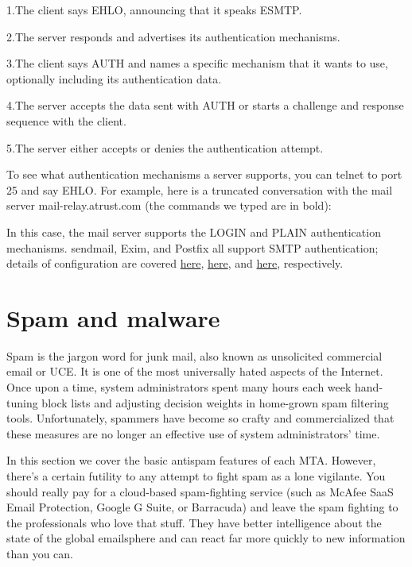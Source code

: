 {1.}The client says EHLO, announcing that it speaks ESMTP.

{2.}The server responds and advertises its authentication mechanisms.

{3.}The client says AUTH and names a specific mechanism that it wants to
use, optionally including its authentication data.

{4.}The server accepts the data sent with AUTH or starts a challenge and
response sequence with the client.

{5.}The server either accepts or denies the authentication attempt.

\protect\hypertarget{part0026_split_012.htmlux5cux23_idTextAnchor1019}{}{}To
see what authentication mechanisms a server supports, you can {telnet}
to port 25 and say EHLO. For example, here is a truncated conversation
with the mail server mail-relay.atrust.com (the commands we typed are in
bold):


In this case, the mail server supports the LOGIN and PLAIN
authentication mechanisms. {sendmail}, Exim, and Postfix all support
SMTP authentication; details of configuration are covered
\protect\hyperlink{part0026_split_038.htmlux5cux23_idTextAnchor1100}{here},
\protect\hyperlink{part0026_split_049.htmlux5cux23_idTextAnchor1144}{here},
and
\protect\hyperlink{part0026_split_063.htmlux5cux23_idTextAnchor1193}{here},
respectively.


\section{Spam and malware}

\protect\hypertarget{part0026_split_013.htmlux5cux23_idIndexMarker2442}{}{}Spam
is the jargon word for junk mail, also known as unsolicited commercial
email or UCE. It is one of the most universally hated aspects of the
Internet. Once upon a time, system administrators spent many hours each
week hand-tuning block lists and adjusting decision weights in
home-grown spam filtering tools. Unfortunately, spammers have become so
crafty and commercialized that these measures are no longer an effective
use of system administrators' time.

In this section we cover the basic antispam features of each MTA.
However, there's a certain futility to any attempt to fight spam as a
lone vigilante. You should really pay for a
\protect\hypertarget{part0026_split_013.htmlux5cux23_idIndexMarker2443}{}{}cloud-based
spam-fighting service (such as
\protect\hypertarget{part0026_split_013.htmlux5cux23_idIndexMarker2444}{}{}McAfee
SaaS Email Protection,
\protect\hypertarget{part0026_split_013.htmlux5cux23_idIndexMarker2445}{}{}Google
G Suite, or
\protect\hypertarget{part0026_split_013.htmlux5cux23_idIndexMarker2446}{}{}Barracuda)
and leave the spam fighting to the professionals who love that stuff.
They have better intelligence about the state of the global emailsphere
and can react far more quickly to new information than you can.

